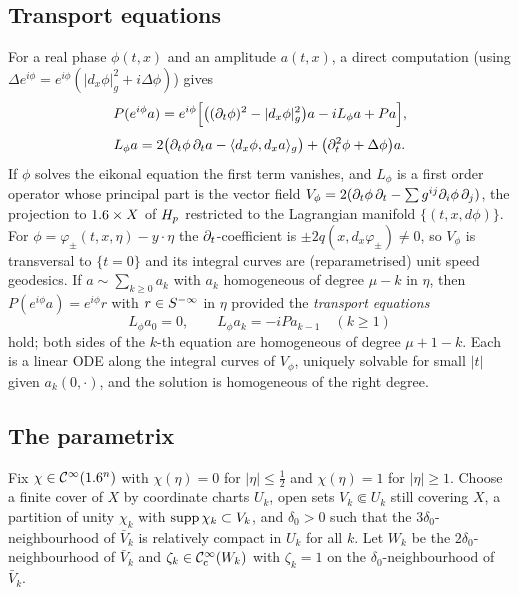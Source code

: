 \subsection{Transport equations}

For a real phase $\phi(t,x)$ and an amplitude $a(t,x)$, a direct computation
(using $\Delta e^{i\phi}=e^{i\phi}(|d_x\phi|_g^2+i\Delta\phi)$) gives
\begin{equation}\label{wave:eq:P-on-exp}
P(e^{i\phi}a)=e^{i\phi}\Big[\big((\partial_t\phi)^2-|d_x\phi|_g^2\big)a-iL_\phi a+Pa\Big],
\end{equation}
\begin{equation*}
L_\phi a=2\big(\partial_t\phi\,\partial_ta-\langle d_x\phi,d_xa\rangle_g\big)+\big(\partial_t^2\phi+\Delta\phi\big)a .
\end{equation*}
If $\phi$ solves the eikonal equation the first term vanishes, and $L_\phi$ is a
first order operator whose principal part is the vector field
$V_\phi=2(\partial_t\phi\,\partial_t-\sum g^{ij}\partial_i\phi\,\partial_j)$, the projection to $1.6\times X$
of $H_{p}$ restricted to the Lagrangian manifold $\{(t,x,d\phi)\}$. For
$\phi=\varphi_\pm(t,x,\eta)-y\cdot\eta$ the $\partial_t$-coefficient is $\pm2q(x,d_x\varphi_\pm)\ne0$,
so $V_\phi$ is transversal to $\{t=0\}$ and its integral curves are (reparametrised)
unit speed geodesics. If $a\sim\sum_{k\ge0}a_k$ with $a_k$ homogeneous of degree
$\mu-k$ in $\eta$, then $P(e^{i\phi}a)=e^{i\phi}r$ with $r\in S^{-\infty}$ in $\eta$
provided the \emph{transport equations}
\begin{equation}\label{wave:eq:transport}
L_\phi a_0=0,\qquad L_\phi a_k=-iPa_{k-1}\quad(k\ge1)
\end{equation}
hold; both sides of the $k$-th equation are homogeneous of degree $\mu+1-k$. Each is
a linear ODE along the integral curves of $V_\phi$, uniquely solvable for small $|t|$
given $a_k(0,\cdot)$, and the solution is homogeneous of the right degree.

\subsection{The parametrix}

Fix $\chi\in\mathcal{C}^\infty(1.6^n)$ with $\chi(\eta)=0$ for $|\eta|\le\frac12$ and $\chi(\eta)=1$ for
$|\eta|\ge1$. Choose a finite cover of $X$ by coordinate charts $U_k$, open sets
$V_k\Subset U_k$ still covering $X$, a partition of unity $\chi_k$ with
$\operatorname{supp}\chi_k\subset V_k$, and $\delta_0>0$ such that the $3\delta_0$-neighbourhood of
$\bar V_k$ is relatively compact in $U_k$ for all $k$. Let $W_k$ be the
$2\delta_0$-neighbourhood of $\bar V_k$ and $\zeta_k\in\mathcal{C}^\infty_{\mathrm{c}}(W_k)$ with $\zeta_k=1$ on the
$\delta_0$-neighbourhood of $\bar V_k$.


